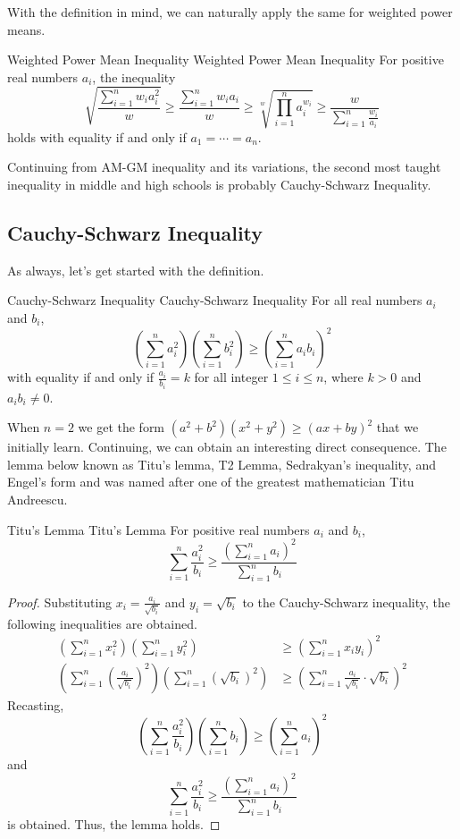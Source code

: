 \documentclass[../main.tex]{subfiles}
\begin{document}
With the definition in mind, we can naturally apply the same for
weighted power means.

\begin{definition}
{Weighted Power Mean Inequality}
{Weighted Power Mean Inequality}
For positive real numbers $a_i$, the inequality
\[
\sqrt{ \frac{\sum_{i=1}^n w_i a_i^2}{w} }
\geq \frac{\sum_{i=1}^n w_i a_i}{w}
\geq \sqrt[w]{\prod_{i=1}^n a_i^{w_i}}
\geq \frac{w}{ \sum_{i=1}^n \frac{w_i}{a_i} }
\]
holds with equality if and only if $a_1 = \cdots = a_n$.
\end{definition}

Continuing from AM-GM inequality and its variations, the second most
taught inequality in middle and high schools is probably
Cauchy-Schwarz Inequality.

\subsection{Cauchy-Schwarz Inequality}

As always, let's get started with the definition.

\begin{definition}
{Cauchy-Schwarz Inequality}
{Cauchy-Schwarz Inequality}
For all real numbers $a_i$ and $b_i$,
\[
\left( \sum_{i=1}^n a_i^2 \right) \left( \sum_{i=1}^n b_i^2 \right)
\geq
\left( \sum_{i=1}^n a_i b_i \right)^2
\]
with equality if and only if $\frac{a_i}{b_i} = k$ for all integer
$1 \leq i \leq n$, where $k > 0$ and $a_ib_i \neq 0$.
\end{definition}

When $n = 2$ we get the form $(a^2 + b^2)(x^2 + y^2) \geq (ax + by)^2$
that we initially learn. Continuing, we can obtain an interesting
direct consequence. The lemma below known as Titu's lemma, T2 Lemma,
Sedrakyan's inequality, and Engel's form and was named after one of
the greatest mathematician Titu Andreescu.

\begin{corollary}
{Titu's Lemma}
{Titu's Lemma}
For positive real numbers $a_i$ and $b_i$,
\[
\sum_{i=1}^n \frac{a_i^2}{b_i}
\geq
\frac{ \left( \sum_{i=1}^n a_i \right)^2 }{ \sum_{i=1}^n b_i }
\]
\end{corollary}
\begin{proof}
Substituting $x_i = \frac{a_i}{\sqrt{b_i}}$ and $y_i = \sqrt{b_i}$
to the Cauchy-Schwarz inequality, the following inequalities are
obtained.
\begin{align*}
    \left( \sum_{i=1}^n x_i^2 \right)
    \left( \sum_{i=1}^n y_i^2 \right)
    &\geq
    \left( \sum_{i=1}^n x_i y_i \right)^2 \\[0.5em]
    \left(
        \sum_{i=1}^n \left( \frac{a_i}{\sqrt{b_i}} \right)^2
    \right)
    \left(
        \sum_{i=1}^n \left( \sqrt{b_i} \right)^2
    \right)
    &\geq
    \left(
        \sum_{i=1}^n \frac{a_i}{\sqrt{b_i}} \cdot \sqrt{b_i}
    \right)^2
\end{align*}
Recasting,
\[
\left( \sum_{i=1}^n \frac{a_i^2}{b_i} \right)
\left( \sum_{i=1}^n b_i \right)
\geq
\left( \sum_{i=1}^n a_i \right)^2
\]
and
\[
\sum_{i=1}^n \frac{a_i^2}{b_i}
\geq
\frac{ \left( \sum_{i=1}^n a_i \right)^2 }{ \sum_{i=1}^n b_i }
\]
is obtained. Thus, the lemma holds.
\end{proof}
\end{document}
